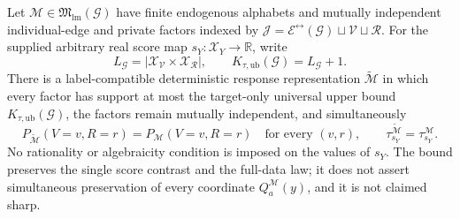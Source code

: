 Let \(\mathcal M\in\mathfrak M_{\mathrm{lm}}(\mathcal G)\) have finite endogenous alphabets and mutually independent individual-edge and private factors indexed by \(\mathcal J=\mathcal E^{\leftrightarrow}(\mathcal G)\sqcup\mathcal V\sqcup\mathcal R\). For the supplied arbitrary real score map \(s_Y:\mathcal X_Y\to\mathbb R\), write
\[
L_{\mathcal G}=\left|\mathcal X_{\mathcal V}\times\mathcal X_{\mathcal R}\right|,
\qquad
K_{\tau,\mathrm{ub}}(\mathcal G)=L_{\mathcal G}+1.
\]
There is a label-compatible deterministic response representation \(\widetilde{\mathcal M}\) in which every factor has support at most the target-only universal upper bound \(K_{\tau,\mathrm{ub}}(\mathcal G)\), the factors remain mutually independent, and simultaneously
\[
P_{\widetilde{\mathcal M}}(V=v,R=r)=P_{\mathcal M}(V=v,R=r)
\quad\text{for every }(v,r),
\qquad
\tau_{s_Y}^{\widetilde{\mathcal M}}=\tau_{s_Y}^{\mathcal M}.
\]
No rationality or algebraicity condition is imposed on the values of \(s_Y\). The bound preserves the single score contrast and the full-data law; it does not assert simultaneous preservation of every coordinate \(Q_a^{\mathcal M}(y)\), and it is not claimed sharp.